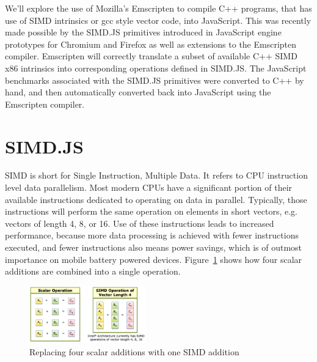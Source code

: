 \documentclass[preprint]{sigplanconf}
\begin{document}
We'll explore the use of Mozilla's Emscripten to compile C++ programs, that
has use of SIMD intrinsics or gcc style vector code, into JavaScript.  This was
recently made possible by the SIMD.JS primitives introduced in JavaScript 
engine prototypes for Chromium and Firefox as well as extensions to the 
Emscripten compiler.  Emscripten will correctly translate a subset of available
C++ SIMD x86 intrinsics into corresponding operations defined in SIMD.JS. The
JavaScript benchmarks associated with the SIMD.JS primitives were converted to 
C++ by hand, and then automatically converted back into JavaScript using the 
Emscripten compiler.

\section{SIMD.JS}

SIMD is short for Single Instruction, Multiple Data.  It refers to CPU 
instruction level data parallelism.  Most modern CPUs have a significant 
portion of their available instructions dedicated to operating on data in
parallel.  Typically, those instructions will perform the same operation on 
elements in short vectors, e.g. vectors of length 4, 8, or 16.  Use of these 
instructions leads to increased performance, because more data processing is 
achieved with fewer instructions executed, and fewer instructions also means
power savings, which is of outmost importance on mobile battery powered
devices.  Figure~\ref{fig:simd} shows how four scalar additions are 
combined into a single operation.

\begin{figure}
\begin{center}
\includegraphics[width=0.45\textwidth]{figures/simd-04.png}
\end{center}
\caption{Replacing four scalar additions with one SIMD addition}
\label{fig:simd}
\end{figure}
\end{document}
